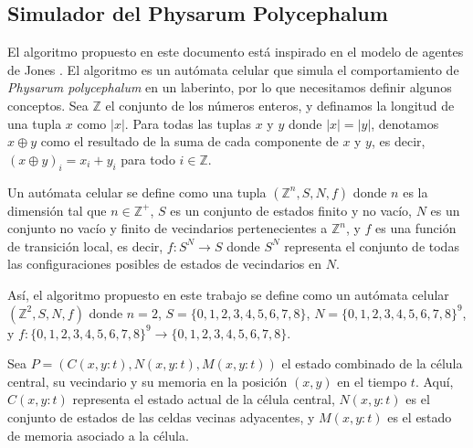\subsection{Simulador del Physarum Polycephalum} %
\label{sub:subsection name}

    
        
        El algoritmo propuesto en este documento est\'a inspirado en el modelo de agentes de Jones 
            \cite{Jones2015}. El algoritmo es un aut\'omata celular que simula el comportamiento de 
            \textit{Physarum polycephalum} en un laberinto, por lo que necesitamos definir algunos 
            conceptos. Sea $\mathbb{Z}$ el conjunto de los n\'umeros enteros, y definamos la longitud 
            de una tupla $x$ como $|x|$. Para todas las tuplas $x$ y $y$ donde $|x| = |y|$, denotamos 
            $x \oplus y$ como el resultado de la suma de cada componente de $x$ y $y$, es decir, 
            $(x \oplus y)_i = x_i + y_i$ para todo $i \in \mathbb{Z}$.

        \vskip 0.5cm

        Un aut\'omata celular se define como una tupla $(\mathbb{Z}^{n}, S, N, f)$ donde $n$ es la dimensi\'on tal 
            que $n \in \mathbb{Z}^{+}$, $S$ es un conjunto de estados finito y no vac\'io, $N$ es un conjunto no 
            vac\'io y finito de vecindarios pertenecientes a $\mathbb{Z}^{n}$, y $f$ es una funci\'on de transici\'on 
            local, es decir, $f: S^N \rightarrow S$ donde $S^N$ representa el conjunto de todas las configuraciones 
            posibles de estados de vecindarios en $N$.

        \vskip 0.5cm

        As\'i, el algoritmo propuesto en este trabajo se define como un aut\'omata celular $(\mathbb{Z}^{2}, S, N, f)$ 
            donde $n = 2$, $S = \{0, 1, 2, 3, 4, 5, 6, 7, 8\}$, $N = \{0, 1, 2, 3, 4, 5, 6, 7, 8\}^9$, y 
            $f : \{0, 1, 2, 3, 4, 5, 6, 7, 8\}^9 \rightarrow \{0, 1, 2, 3, 4, 5, 6, 7, 8\}$.

        \vskip 0.5cm

        Sea \( P = (C(x, y: t), N(x, y: t), M(x, y: t)) \) el estado combinado de la c\'elula central, 
            su vecindario y su memoria en la posici\'on \((x, y)\) en el tiempo \( t \). Aqu\'i, \(C(x, y: t)\) 
            representa el estado actual de la c\'elula central, \(N(x, y: t)\) es el conjunto de estados de las 
            celdas vecinas adyacentes, y \(M(x, y: t)\) es el estado de memoria asociado a la c\'elula.

